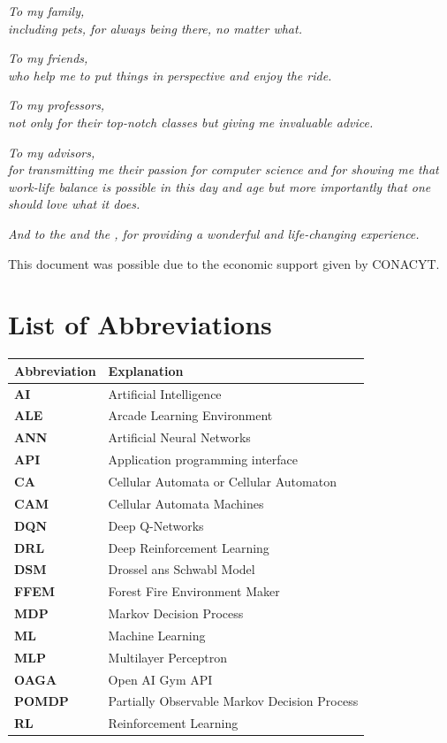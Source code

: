 \documentclass[
  12pt,
  openany]{book}
\begin{document}
\begin{flushleft}
\emph{To my family,\\including pets, for always being there, no matter what.}

\emph{To my friends,\\who help me to put things in perspective and enjoy the ride.}

\emph{To my professors,\\not only for their top-notch classes but giving me invaluable advice.}

\emph{To my advisors,\\for transmitting me their passion for computer science and for
showing me that work-life balance is possible in this day and age but more importantly that one should love what it does.}

\emph{And to the  and the , for providing a wonderful and life-changing experience.}
\end{flushleft}

\begin{flushright}
\footnotesize{This document was possible due to the economic support given by CONACYT.}
\end{flushright}

\tableofcontents

\listoffigures

\listoftables

\hypertarget{list-of-abbreviations}{%
\chapter*{List of Abbreviations}\label{list-of-abbreviations}}

\begin{tabular}{>{\bfseries}ll}
\toprule
Abbreviation & Explanation\\
\midrule
AI & Artificial Intelligence\\
ALE & Arcade Learning Environment\\
ANN & Artificial Neural Networks\\
API & Application programming interface\\
CA & Cellular Automata or Cellular Automaton\\
\addlinespace
CAM & Cellular Automata Machines\\
DQN & Deep Q-Networks\\
DRL & Deep Reinforcement Learning\\
DSM & Drossel ans Schwabl Model\\
FFEM & Forest Fire Environment Maker\\
\addlinespace
MDP & Markov Decision Process\\
ML & Machine Learning\\
MLP & Multilayer Perceptron\\
OAGA & Open AI Gym API\\
POMDP & Partially Observable Markov Decision Process\\
\addlinespace
RL & Reinforcement Learning\\
\bottomrule
\end{tabular}
\end{document}
